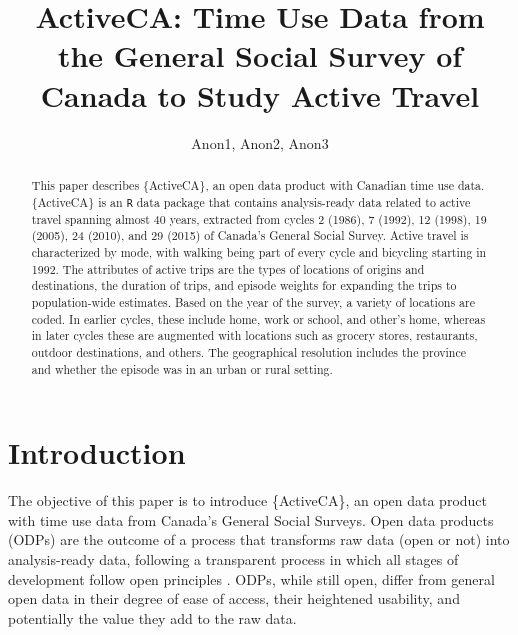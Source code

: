\documentclass[Royal,times,sageh]{sagej}
\begin{document}

\title{ActiveCA: Time Use Data from the General Social Survey of Canada
to Study Active Travel}

\runninghead{}

\author{Anon1\affilnum{}, Anon2\affilnum{}, Anon3\affilnum{}}

\affiliation{\affilnum{}{}}



\begin{abstract}
This paper describes \{ActiveCA\}, an open data product with Canadian
time use data. \{ActiveCA\} is an \texttt{R} data package that contains
analysis-ready data related to active travel spanning almost 40 years,
extracted from cycles 2 (1986), 7 (1992), 12 (1998), 19 (2005), 24
(2010), and 29 (2015) of Canada's General Social Survey. Active travel
is characterized by mode, with walking being part of every cycle and
bicycling starting in 1992. The attributes of active trips are the types
of locations of origins and destinations, the duration of trips, and
episode weights for expanding the trips to population-wide estimates.
Based on the year of the survey, a variety of locations are coded. In
earlier cycles, these include home, work or school, and other's home,
whereas in later cycles these are augmented with locations such as
grocery stores, restaurants, outdoor destinations, and others. The
geographical resolution includes the province and whether the episode
was in an urban or rural setting.
\end{abstract}


\maketitle

\section{Introduction}\label{introduction}

The objective of this paper is to introduce \{ActiveCA\}, an open data
product with time use data from Canada's General Social Surveys. Open
data products (ODPs) are the outcome of a process that transforms raw
data (open or not) into analysis-ready data, following a transparent
process in which all stages of development follow open principles
\citep{arribas-bel2021}. ODPs, while still open, differ from general
open data in their degree of ease of access, their heightened usability,
and potentially the value they add to the raw data.
\end{document}
